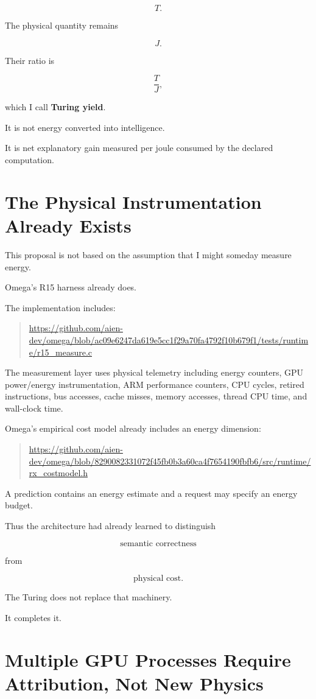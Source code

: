 \documentclass[11pt]{article}
\begin{document}
\[
T.
\]

The physical quantity remains

\[
J.
\]

Their ratio is

\[
\boxed{\frac{T}{J}},
\]

which I call \textbf{Turing yield}.

It is not energy converted into intelligence.

It is net explanatory gain measured per joule consumed by the declared computation.

\section{The Physical Instrumentation Already Exists}

This proposal is not based on the assumption that I might someday measure energy.

Omega's R15 harness already does.

The implementation includes:

\begin{quote}
\url{https://github.com/aien-dev/omega/blob/ac09e6247da619e5cc1f29a70fa4792f10b679f1/tests/runtime/r15_measure.c}
\end{quote}

The measurement layer uses physical telemetry including energy counters, GPU power/energy instrumentation, ARM performance counters, CPU cycles, retired instructions, bus accesses, cache misses, memory accesses, thread CPU time, and wall-clock time.

Omega's empirical cost model already includes an energy dimension:

\begin{quote}
\url{https://github.com/aien-dev/omega/blob/8290082331072f45fb0b3a60ca4f7654190fbfb6/src/runtime/rx_costmodel.h}
\end{quote}

A prediction contains an energy estimate and a request may specify an energy budget.

Thus the architecture had already learned to distinguish

\[
\text{semantic correctness}
\]

from

\[
\text{physical cost}.
\]

The Turing does not replace that machinery.

It completes it.

\section{Multiple GPU Processes Require Attribution, Not New Physics}
\end{document}
